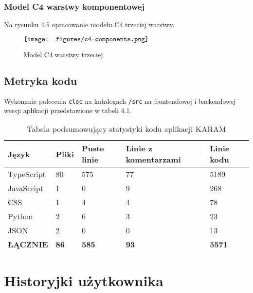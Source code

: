 \documentclass[shortabstract,inz]{iithesis}
\begin{document}
\subsection{Model C4 warstwy komponentowej}
Na rysunku 4.5 opracowanie modelu C4 trzeciej warstwy.
\begin{figure}[H]
	\centering
	$\vcenter{\hbox{\texttt{[image: figures/c4-components.png]}}}$
    \caption[]{Model C4 warstwy trzeciej}
    \label{fig:model-c4-komponentowa}
\end{figure}

\section{Metryka kodu}
Wykonanie polecenia \texttt{cloc} na katalogach \texttt{/src} na frontendowej i backendowej wersji aplikacji przedstawione w tabeli 4.1.

\begin{table}[H]
    \begin{tabular}{|l|l|l|l|l|}
    \hline
    \textbf{Język}   & \textbf{Pliki} & \textbf{Puste linie} & \textbf{Linie z komentarzami} & \textbf{Linie kodu} \\ \hline
    TypeScript       & 80             & 575                  & 77                           & 5189                \\ \hline
    JavaScript & 1             & 0                   & 9                           & 268                \\ \hline
    CSS              & 1              & 4                    & 4                             & 78                  \\ \hline
    Python             & 2              & 6                    & 3                             & 23                  \\ \hline
    JSON             & 2              & 0                    & 0                             & 13                  \\ \hline
    \textbf{ŁĄCZNIE} & \textbf{86}    & \textbf{585}         & \textbf{93}                  & \textbf{5571}       \\ \hline
    \end{tabular}
    \caption{\label{tab:stats-code}Tabela podsumowujący statystyki kodu aplikacji KARAM}
\end{table}


\chapter{Historyjki użytkownika}
\end{document}
